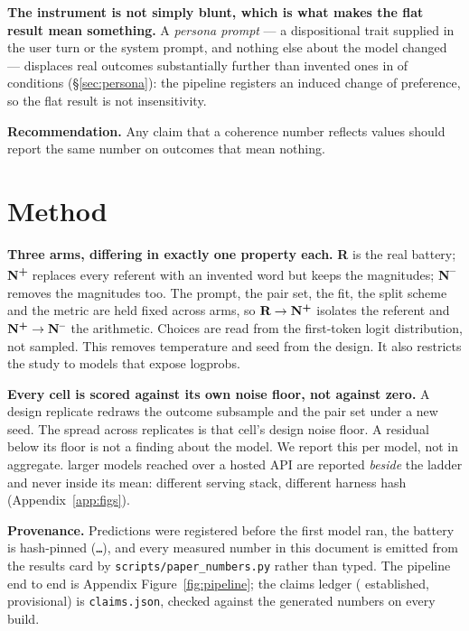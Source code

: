 \documentclass[11pt,a4paper]{article}
\newcommand{\armR}{\textbf{R}}
\newcommand{\armNp}{\textbf{N\textsuperscript{+}}}
\newcommand{\armNm}{\textbf{N\textsuperscript{--}}}
\begin{document}
\textbf{The instrument is not simply blunt, which is what makes the flat result
mean something.} A \emph{persona prompt} --- a dispositional trait supplied in
the user turn or the system prompt, and nothing else about the model changed ---
displaces real outcomes substantially further than invented ones in
\PersonaAbovePointThree{} of \NPersonaCells{}
conditions (\S\ref{sec:persona}): the pipeline registers an induced change of
preference, so the flat result is not insensitivity.

\textbf{Recommendation.} Any claim that a coherence number reflects values
should report the same number on outcomes that mean nothing.

\section{Method}\label{sec:method}

\textbf{Three arms, differing in exactly one property each.} \armR{} is the real
battery; \armNp{} replaces every referent with an invented word but keeps the
magnitudes; \armNm{} removes the magnitudes too. The prompt, the pair set, the
fit, the split scheme and the metric are held fixed across arms, so
$\armR \to \armNp$ isolates the referent and $\armNp \to \armNm$ the arithmetic.
Choices are read from the first-token logit distribution, not sampled. This
removes temperature and seed from the design. It also restricts the study to
models that expose logprobs.

\textbf{Every cell is scored against its own noise floor, not against zero.} A
design replicate redraws the outcome subsample and the pair set under a new
seed. The spread across \NDesignReps{} replicates is that cell's design noise
floor. A residual below its floor is not a finding about the model. We report
this per model, not in aggregate. \NHosted{} larger
models reached over a hosted API are reported \emph{beside} the ladder and never
inside its mean: different serving stack, different harness hash
(Appendix~\ref{app:figs}).

\textbf{Provenance.} Predictions were registered before the first model ran, the
battery is hash-pinned (\texttt{\BatterySHA\ldots}), and every measured number
in this document is emitted from the results card by
\texttt{scripts/paper\_numbers.py} rather than typed. The pipeline end to end is
Appendix Figure~\ref{fig:pipeline}; the claims ledger
(\NClaimsEstablished{} established, \NClaimsProvisional{} provisional) is
\texttt{claims.json}, checked against the generated numbers on every build.
\end{document}
